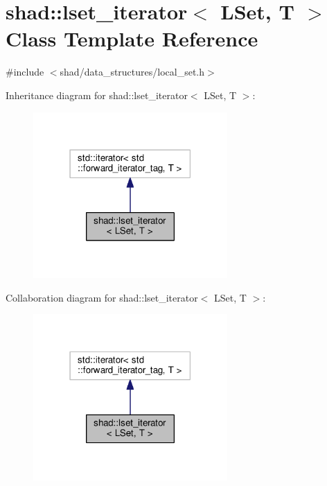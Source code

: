 \hypertarget{classshad_1_1lset__iterator}{\section{shad\-:\-:lset\-\_\-iterator$<$ L\-Set, T $>$ Class Template Reference}
\label{classshad_1_1lset__iterator}
}


{\ttfamily \#include $<$shad/data\-\_\-structures/local\-\_\-set.\-h$>$}



Inheritance diagram for shad\-:\-:lset\-\_\-iterator$<$ L\-Set, T $>$\-:
\nopagebreak
\begin{figure}[H]
\begin{center}
\leavevmode
\includegraphics[width=210pt]{classshad_1_1lset__iterator__inherit__graph}
\end{center}
\end{figure}


Collaboration diagram for shad\-:\-:lset\-\_\-iterator$<$ L\-Set, T $>$\-:
\nopagebreak
\begin{figure}[H]
\begin{center}
\leavevmode
\includegraphics[width=210pt]{classshad_1_1lset__iterator__coll__graph}
\end{center}
\end{figure}
